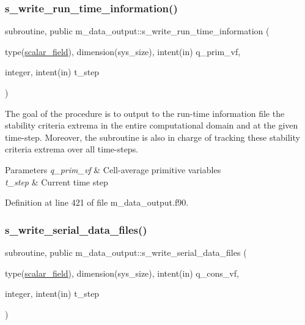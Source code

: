 \subsubsection{\texorpdfstring{s\+\_\+write\+\_\+run\+\_\+time\+\_\+information()}{s\_write\_run\_time\_information()}}
{\footnotesize\ttfamily subroutine, public m\+\_\+data\+\_\+output\+::s\+\_\+write\+\_\+run\+\_\+time\+\_\+information (\begin{DoxyParamCaption}\item[{type(\hyperlink{structm__derived__types_1_1scalar__field}{scalar\+\_\+field}), dimension(sys\+\_\+size), intent(in)}]{q\+\_\+prim\+\_\+vf,  }\item[{integer, intent(in)}]{t\+\_\+step }\end{DoxyParamCaption})}



The goal of the procedure is to output to the run-\/time information file the stability criteria extrema in the entire computational domain and at the given time-\/step. Moreover, the subroutine is also in charge of tracking these stability criteria extrema over all time-\/steps. 


\begin{DoxyParams}{Parameters}
{\em q\+\_\+prim\+\_\+vf} & Cell-\/average primitive variables \\
\hline
{\em t\+\_\+step} & Current time step \\
\hline
\end{DoxyParams}


Definition at line 421 of file m\+\_\+data\+\_\+output.\+f90.

\mbox{\label{namespacem__data__output_a04c6b0f01b8561e248a740b017fc4f7d}} 
\subsubsection{\texorpdfstring{s\+\_\+write\+\_\+serial\+\_\+data\+\_\+files()}{s\_write\_serial\_data\_files()}}
{\footnotesize\ttfamily subroutine, public m\+\_\+data\+\_\+output\+::s\+\_\+write\+\_\+serial\+\_\+data\+\_\+files (\begin{DoxyParamCaption}\item[{type(\hyperlink{structm__derived__types_1_1scalar__field}{scalar\+\_\+field}), dimension(sys\+\_\+size), intent(in)}]{q\+\_\+cons\+\_\+vf,  }\item[{integer, intent(in)}]{t\+\_\+step }\end{DoxyParamCaption})}



